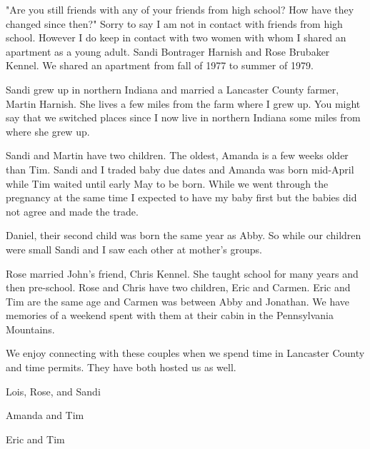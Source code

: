 "Are you still friends with any of your friends from high school? How have they changed since then?"
Sorry to say I am not in contact with friends from high school.
However I do keep in contact with two women with whom I shared an apartment as a young adult.
Sandi Bontrager Harnish and Rose Brubaker Kennel.
We shared an apartment from fall of 1977 to summer of 1979.

Sandi grew up in northern Indiana and married a Lancaster County farmer, Martin Harnish.
She lives a few miles from the farm where I grew up.
You might say that we switched places since I now live in northern Indiana some miles from where she grew up.

Sandi and Martin have two children.
The oldest, Amanda is a few weeks older than Tim.
Sandi and I traded baby due dates and Amanda was born mid-April while Tim waited until early May to be born.
While we went through the pregnancy at the same time I expected to have my baby first but the babies did not agree and made the trade.

Daniel, their second child was born the same year as Abby.
So while our children were small Sandi and I saw each other at mother's groups.

Rose married John's friend, Chris Kennel.
She taught school for many years and then pre-school.
Rose and Chris have two children, Eric and Carmen.
Eric and Tim are the same age and Carmen was between Abby and Jonathan.
We have memories of a weekend spent with them at their cabin in the Pennsylvania Mountains.

We enjoy connecting with these couples when we spend time in Lancaster County and time permits.
They have both hosted us as well.

Lois, Rose, and Sandi

Amanda and Tim

Eric and Tim





